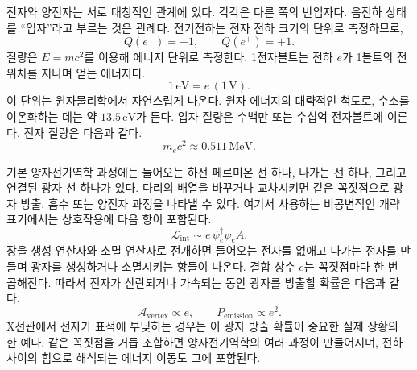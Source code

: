 \begin{table}[h]
\centering
{}%
\caption{입자 목록의 첫머리를 이루는 광자와 전자--양전자 항목.}
\end{table}

전자와 양전자는 서로 대칭적인 관계에 있다. 각각은 다른 쪽의 반입자다. 음전하 상태를 ``입자''라고 부르는 것은 관례다. 전기전하는 전자 전하 크기의 단위로 측정하므로,
\begin{equation}
Q(e^-)=-1,\qquad Q(e^+)=+1.
\end{equation}
질량은 \(E=mc^2\)를 이용해 에너지 단위로 측정한다. 1전자볼트는 전하 \(e\)가 1볼트의 전위차를 지나며 얻는 에너지다.
\begin{equation}
1\,\mathrm{eV}=e\,(1\,\mathrm V).
\end{equation}
이 단위는 원자물리학에서 자연스럽게 나온다. 원자 에너지의 대략적인 척도로, 수소를 이온화하는 데는 약 \(13.5\,\mathrm{eV}\)가 든다. 입자 질량은 수백만 또는 수십억 전자볼트에 이른다. 전자 질량은 다음과 같다.
\begin{equation}
m_e c^2 \approx 0.511\,\mathrm{MeV}.
\end{equation}

\begin{classroomqa}
\end{classroomqa}

기본 양자전기역학 과정에는 들어오는 하전 페르미온 선 하나, 나가는 선 하나, 그리고 연결된 광자 선 하나가 있다. 다리의 배열을 바꾸거나 교차시키면 같은 꼭짓점으로 광자 방출, 흡수 또는 양전자 과정을 나타낼 수 있다. 여기서 사용하는 비공변적인 개략 표기에서는 상호작용에 다음 항이 포함된다.
\begin{equation}
\mathcal{L}_{\mathrm{int}}\sim e\,\psi_e^\dagger \psi_e A.
\end{equation}
장을 생성 연산자와 소멸 연산자로 전개하면 들어오는 전자를 없애고 나가는 전자를 만들며 광자를 생성하거나 소멸시키는 항들이 나온다. 결합 상수 \(e\)는 꼭짓점마다 한 번 곱해진다. 따라서 전자가 산란되거나 가속되는 동안 광자를 방출할 확률은 다음과 같다.
\begin{equation}
\mathcal{A}_{\mathrm{vertex}}\propto e,
\qquad
P_{\mathrm{emission}}\propto e^2.
\end{equation}
X선관에서 전자가 표적에 부딪히는 경우는 이 광자 방출 확률이 중요한 실제 상황의 한 예다. 같은 꼭짓점을 거듭 조합하면 양자전기역학의 여러 과정이 만들어지며, 전하 사이의 힘으로 해석되는 에너지 이동도 그에 포함된다.

